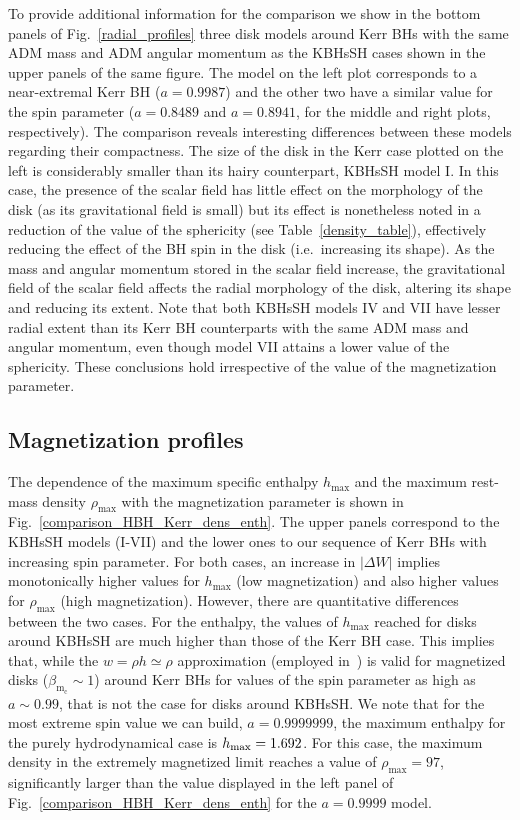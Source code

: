\documentclass[twocolumn,aps,showpacs,showkeys,prd,superscriptaddress,byrevtex, amsmath]{revtex4-1}
\begin{document}
To provide additional information for the comparison we show in the bottom panels of Fig.~\ref{radial_profiles} three disk models around Kerr BHs  with the same ADM mass and ADM angular momentum as the KBHsSH cases shown in the upper panels of the same figure. The model on the left plot corresponds to a near-extremal Kerr BH ($a=0.9987$) and the other two have a similar value for the  spin parameter ($a=0.8489$ and $a=0.8941$, for the middle and right plots, respectively). The comparison reveals interesting differences between these models regarding their compactness. The size of the disk in the Kerr case plotted on the left is considerably smaller than its hairy counterpart, KBHsSH model I. In this case, the presence of the scalar field has little effect on the morphology of the disk (as its gravitational field is small) but its effect is nonetheless noted in a reduction of the value of the sphericity (see Table~\ref{density_table}), effectively reducing the effect of the BH spin in the disk (i.e.~increasing its shape). As the mass and angular momentum stored in the scalar field increase, the gravitational field of the scalar field affects the radial morphology of the disk, altering its shape and reducing its extent. Note that both KBHsSH models IV and VII have lesser radial extent than its Kerr BH counterparts with the same ADM mass and angular momentum, even though model VII attains a lower value of the sphericity. These conclusions hold irrespective of the value of the magnetization parameter.

\subsection{Magnetization profiles}

The dependence of the maximum specific enthalpy $h_{\mathrm{max}}$ and the maximum rest-mass density $\rho_{\mathrm{max}}$ with the magnetization parameter is shown in Fig.~\ref{comparison_HBH_Kerr_dens_enth}. The upper panels correspond to the KBHsSH models (I-VII) and the lower ones to our sequence of Kerr BHs with increasing spin parameter. For both cases, an increase in $|\Delta W|$ implies monotonically  higher values for $h_{\mathrm{max}}$ (low magnetization) and also higher values for $\rho_{\mathrm{max}}$ (high magnetization). However, there are quantitative differences between the two cases. For the enthalpy, the values of $h_{\mathrm{max}}$ reached for disks around KBHsSH are much higher than those of the Kerr BH case. This implies that, while the $w = \rho h \simeq \rho$ approximation (employed in~\cite{Komissarov:2006,Gimeno-Soler:2017}) is valid for magnetized disks ($\beta_{\mathrm{m_c}} \sim 1$) around Kerr BHs for values of the spin parameter as high as $a \sim 0.99$, that is not the case for disks around KBHsSH. We note that for the most extreme spin value we can build, $a=0.9999999$, the maximum enthalpy for the purely hydrodynamical case is $h_{\rm max}=1.692$. For this case, the maximum density in the extremely magnetized limit reaches a value of $\rho_{\mathrm{max}} = 97$, significantly larger than the value displayed in the left  panel of Fig.~\ref{comparison_HBH_Kerr_dens_enth} for the $a=0.9999$ model.
\end{document}
